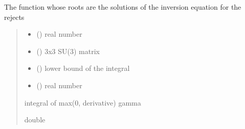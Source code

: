 \documentclass[letterpaper,10pt,english]{sphinxmanual}
\begin{document}
\begin{fulllineitems}
\label{\detokenize{numerical_reject:numerical_reject.f_8}}
\pysigstartsignatures
\pysiglinewithargsret
{}
{\sphinxparamcomma {}\sphinxparamcomma {}\sphinxparamcomma {}}
{}
\pysigstopsignatures
\sphinxAtStartPar
The function whose roots are the solutions of the inversion equation for the rejects
\begin{quote}\begin{description}
\begin{itemize}
\item {} 
\sphinxAtStartPar
{} () \textendash{} real number

\item {} 
\sphinxAtStartPar
{} () \textendash{} 3x3 SU(3) matrix

\item {} 
\sphinxAtStartPar
{} () \textendash{} lower bound of the integral

\item {} 
\sphinxAtStartPar
{} () \textendash{} real number

\end{itemize}

\sphinxAtStartPar
integral of max(0, derivative) \sphinxhyphen{} gamma

\sphinxAtStartPar
double

\end{description}\end{quote}

\end{fulllineitems}

\end{document}
